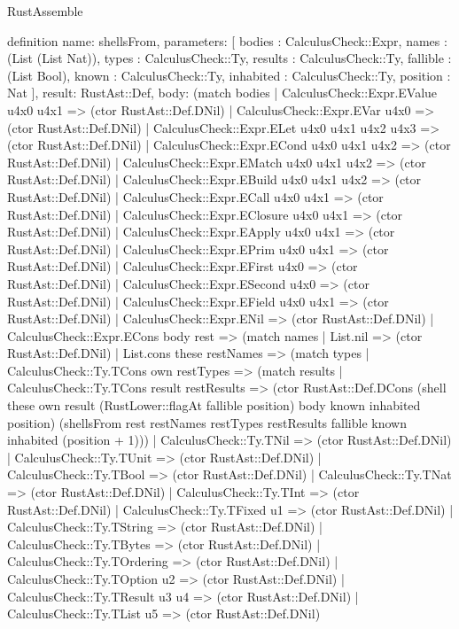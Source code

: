 \begin{lexlean}{RustAssemble}
\begin{semanticmodule}
definition{
  name: shellsFrom,
  parameters: [
    bodies : CalculusCheck::Expr,
    names : (List (List Nat)),
    types : CalculusCheck::Ty,
    results : CalculusCheck::Ty,
    fallible : (List Bool),
    known : CalculusCheck::Ty,
    inhabited : CalculusCheck::Ty,
    position : Nat
  ],
  result: RustAst::Def,
  body: (match bodies
    | CalculusCheck::Expr.EValue u4x0 u4x1 => (ctor RustAst::Def.DNil)
    | CalculusCheck::Expr.EVar u4x0 => (ctor RustAst::Def.DNil)
    | CalculusCheck::Expr.ELet u4x0 u4x1 u4x2 u4x3 => (ctor RustAst::Def.DNil)
    | CalculusCheck::Expr.ECond u4x0 u4x1 u4x2 => (ctor RustAst::Def.DNil)
    | CalculusCheck::Expr.EMatch u4x0 u4x1 u4x2 => (ctor RustAst::Def.DNil)
    | CalculusCheck::Expr.EBuild u4x0 u4x1 u4x2 => (ctor RustAst::Def.DNil)
    | CalculusCheck::Expr.ECall u4x0 u4x1 => (ctor RustAst::Def.DNil)
    | CalculusCheck::Expr.EClosure u4x0 u4x1 => (ctor RustAst::Def.DNil)
    | CalculusCheck::Expr.EApply u4x0 u4x1 => (ctor RustAst::Def.DNil)
    | CalculusCheck::Expr.EPrim u4x0 u4x1 => (ctor RustAst::Def.DNil)
    | CalculusCheck::Expr.EFirst u4x0 => (ctor RustAst::Def.DNil)
    | CalculusCheck::Expr.ESecond u4x0 => (ctor RustAst::Def.DNil)
    | CalculusCheck::Expr.EField u4x0 u4x1 => (ctor RustAst::Def.DNil)
    | CalculusCheck::Expr.ENil => (ctor RustAst::Def.DNil)
    | CalculusCheck::Expr.ECons body rest => (match names
      | List.nil => (ctor RustAst::Def.DNil)
      | List.cons these restNames => (match types
        | CalculusCheck::Ty.TCons own restTypes => (match results
          | CalculusCheck::Ty.TCons result restResults => (ctor RustAst::Def.DCons (shell these own result (RustLower::flagAt fallible position) body known inhabited position) (shellsFrom rest restNames restTypes restResults fallible known inhabited (position + 1)))
          | CalculusCheck::Ty.TNil => (ctor RustAst::Def.DNil)
          | CalculusCheck::Ty.TUnit => (ctor RustAst::Def.DNil)
          | CalculusCheck::Ty.TBool => (ctor RustAst::Def.DNil)
          | CalculusCheck::Ty.TNat => (ctor RustAst::Def.DNil)
          | CalculusCheck::Ty.TInt => (ctor RustAst::Def.DNil)
          | CalculusCheck::Ty.TFixed u1 => (ctor RustAst::Def.DNil)
          | CalculusCheck::Ty.TString => (ctor RustAst::Def.DNil)
          | CalculusCheck::Ty.TBytes => (ctor RustAst::Def.DNil)
          | CalculusCheck::Ty.TOrdering => (ctor RustAst::Def.DNil)
          | CalculusCheck::Ty.TOption u2 => (ctor RustAst::Def.DNil)
          | CalculusCheck::Ty.TResult u3 u4 => (ctor RustAst::Def.DNil)
          | CalculusCheck::Ty.TList u5 => (ctor RustAst::Def.DNil)
}
\end{semanticmodule}
\end{lexlean}
